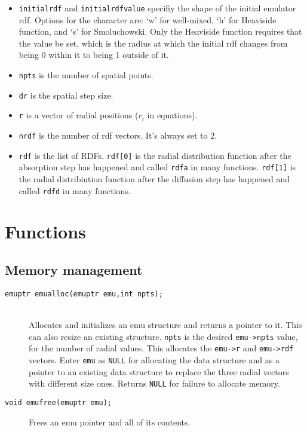 \documentclass {book}
\newcommand {\ttt} {\texttt}
\begin{document}
\begin{itemize}
\item \ttt{initialrdf} and \ttt{initialrdfvalue} specifiy the shape of the initial emulator rdf. Options for the character are: `w' for well-mixed, `h' for Heaviside function, and `s' for Smoluchowski. Only the Heaviside function requires that the value be set, which is the radius at which the initial rdf changes from being 0 within it to being 1 outside of it.

\item \ttt{npts} is the number of spatial points.

\item \ttt{dr} is the spatial step size.

\item \ttt{r} is a vector of radial positions ($r_i$ in equations).

\item \ttt{nrdf} is the number of rdf vectors. It's always set to 2.

\item \ttt{rdf} is the list of RDFs. \ttt{rdf[0]} is the radial distribution function after the absorption step has happened and called \ttt{rdfa} in many functions. \ttt{rdf[1]} is the radial distribiution function after the diffusion step has happened and called \ttt{rdfd} in many functions.

\end{itemize}

\section{Functions}

\subsection{Memory management}

\begin{description}

\item[\ttt{emuptr emualloc(emuptr emu,int npts);}]
\hfill \\
Allocates and initializes an emu structure and returns a pointer to it. This can also resize an existing structure. \ttt{npts} is the desired \ttt{emu->npts} value, for the number of radial values. This allocates the \ttt{emu->r} and \ttt{emu->rdf} vectors. Enter \ttt{emu} as \ttt{NULL} for allocating the data structure and as a pointer to an existing data structure to replace the three radial vectors with different size ones. Returns \ttt{NULL} for failure to allocate memory.

\item[\ttt{void emufree(emuptr emu);}]
Frees an emu pointer and all of its contents.

\end{description}
\end{document}
